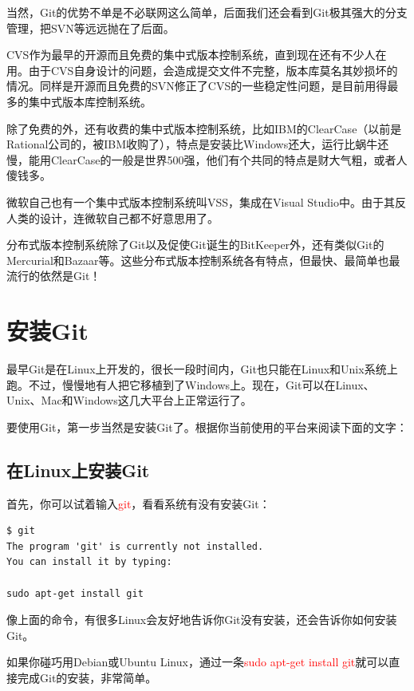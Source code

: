 当然，Git的优势不单是不必联网这么简单，后面我们还会看到Git极其强大的分支管理，把SVN等远远抛在了后面。

CVS作为最早的开源而且免费的集中式版本控制系统，直到现在还有不少人在用。由于CVS自身设计的问题，会造成提交文件不完整，版本库莫名其妙损坏的情况。同样是开源而且免费的SVN修正了CVS的一些稳定性问题，是目前用得最多的集中式版本库控制系统。

除了免费的外，还有收费的集中式版本控制系统，比如IBM的ClearCase（以前是Rational公司的，被IBM收购了），特点是安装比Windows还大，运行比蜗牛还慢，能用ClearCase的一般是世界500强，他们有个共同的特点是财大气粗，或者人傻钱多。

微软自己也有一个集中式版本控制系统叫VSS，集成在Visual Studio中。由于其反人类的设计，连微软自己都不好意思用了。

分布式版本控制系统除了Git以及促使Git诞生的BitKeeper外，还有类似Git的Mercurial和Bazaar等。这些分布式版本控制系统各有特点，但最快、最简单也最流行的依然是Git！


\chapter{安装Git}

最早Git是在Linux上开发的，很长一段时间内，Git也只能在Linux和Unix系统上跑。不过，慢慢地有人把它移植到了Windows上。现在，Git可以在Linux、Unix、Mac和Windows这几大平台上正常运行了。

要使用Git，第一步当然是安装Git了。根据你当前使用的平台来阅读下面的文字：

\section{在Linux上安装Git}

首先，你可以试着输入\textcolor{red}{git}，看看系统有没有安装Git：

\begin{verbatim}
$ git
The program 'git' is currently not installed. 
You can install it by typing:

sudo apt-get install git
\end{verbatim}

像上面的命令，有很多Linux会友好地告诉你Git没有安装，还会告诉你如何安装Git。

如果你碰巧用Debian或Ubuntu Linux，通过一条\textcolor{red}{sudo apt-get install git}就可以直接完成Git的安装，非常简单。

